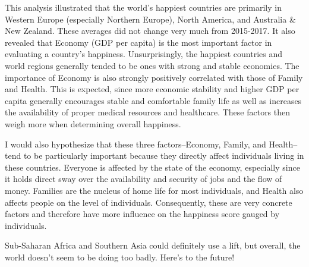 \documentclass[]{article}
\begin{document}
This analysis illustrated that the world's happiest countries are
primarily in Western Europe (especially Northern Europe), North America,
and Australia \& New Zealand. These averages did not change very much
from 2015-2017. It also revealed that Economy (GDP per capita) is the
most important factor in evaluating a country's happiness.
Unsurprisingly, the happiest countries and world regions generally
tended to be ones with strong and stable economies. The importance of
Economy is also strongly positively correlated with those of Family and
Health. This is expected, since more economic stability and higher GDP
per capita generally encourages stable and comfortable family life as
well as increases the availability of proper medical resources and
healthcare. These factors then weigh more when determining overall
happiness.

I would also hypothesize that these three factors--Economy, Family, and
Health--tend to be particularly important because they directly affect
individuals living in these countries. Everyone is affected by the state
of the economy, especially since it holds direct sway over the
availability and security of jobs and the flow of money. Families are
the nucleus of home life for most individuals, and Health also affects
people on the level of individuals. Consequently, these are very
concrete factors and therefore have more influence on the happiness
score gauged by individuals.

Sub-Saharan Africa and Southern Asia could definitely use a lift, but
overall, the world doesn't seem to be doing too badly. Here's to the
future!
\end{document}
